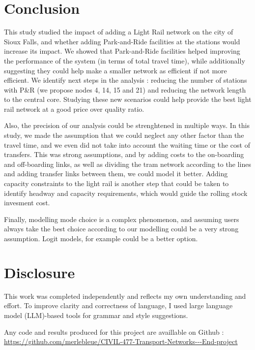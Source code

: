 \section{Conclusion}

This study studied the impact of adding a Light Rail network on the city of Sioux Falls, and whether adding Park-and-Ride facilities at the stations would increase its impact. We showed that Park-and-Ride facilities helped improving the performance of the system (in terms of total travel time), while additionally suggesting they could help make a smaller network as efficient if not more efficient. We identify next steps in the analysis : reducing the number of stations with P\&R (we propose nodes 4, 14, 15 and 21) and reducing the network length to the central core. Studying these new scenarios could help provide the best light rail network at a good price over quality ratio.

Also, the precision of our analysis could be strenghtened in multiple ways. In this study, we made the assumption that we could neglect any other factor than the travel time, and we even did not take into account the waiting time or the cost of transfers. This was strong assumptions, and by adding costs to the on-boarding and off-boarding links, as well as dividing the tram network according to the lines and adding transfer links between them, we could model it better. Adding capacity constraints to the light rail is another step that could be taken to identify headway and capacity requirements, which would guide the rolling stock invesment cost.

Finally, modelling mode choice is a complex phenomenon, and assuming users always take the best choice according to our modelling could be a very strong assumption. Logit models, for example could be a better option.

\vfill

\section*{Disclosure}

This work was completed independently and reflects my own understanding and effort. To improve clarity and correctness of language, I used large language model (LLM)-based tools for grammar and style suggestions.

Any code and results produced for this project are availlable on Github : \url{https://github.com/merlebleue/CIVIL-477-Transport-Networks---End-project}